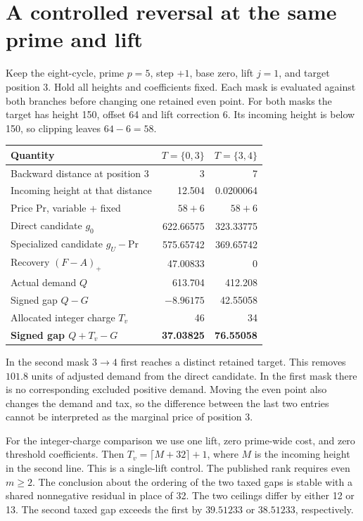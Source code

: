 \documentclass[12pt,letterpaper]{article}
\newcommand{\pagepart}[1]{\clearpage\section{#1}}
\begin{document}
\pagepart{A controlled reversal at the same prime and lift}
Keep the eight-cycle, prime \(p=5\), step \(+1\), base zero, lift \(j=1\), and target position 3. Hold all heights and coefficients fixed. Each mask is evaluated against both branches before changing one retained even point. For both masks the target has height 150, offset 64 and lift correction 6. Its incoming height is below 150, so clipping leaves \(64-6=58\).

\begin{center}\begin{tabular}{@{}lrr@{}}\toprule
Quantity & \(T=\{0,3\}\) & \(T=\{3,4\}\)\\\midrule
Backward distance at position 3 & 3 & 7\\
Incoming height at that distance & 12.504 & 0.0200064\\
Price \(\mathrm{Pr}\), variable + fixed & \(58+6\) & \(58+6\)\\
Direct candidate \(g_0\) & 622.66575 & 323.33775\\
Specialized candidate \(g_U-\mathrm{Pr}\) & 575.65742 & 369.65742\\
Recovery \((F-A)_+\) & 47.00833 & 0\\
Actual demand \(Q\) & 613.704 & 412.208\\
Signed gap \(Q-G\) & \(-8.96175\) & 42.55058\\
Allocated integer charge \(T_v\) & 46 & 34\\
\textbf{Signed gap \(Q+T_v-G\)} & \textbf{37.03825} & \textbf{76.55058}\\\bottomrule
\end{tabular}\end{center}
In the second mask \(3\to4\) first reaches a distinct retained target. This removes \(101.8\) units of adjusted demand from the direct candidate. In the first mask there is no corresponding excluded positive demand. Moving the even point also changes the demand and tax, so the difference between the last two entries cannot be interpreted as the marginal price of position 3.

For the integer-charge comparison we use one lift, zero prime-wide cost, and zero threshold coefficients. Then \(T_v=\lceil M+32\rceil+1\), where \(M\) is the incoming height in the second line. This is a single-lift control. The published rank requires even \(m\ge2\). The conclusion about the ordering of the two taxed gaps is stable with a shared nonnegative residual in place of 32. The two ceilings differ by either 12 or 13. The second taxed gap exceeds the first by \(39.51233\) or \(38.51233\), respectively.
\end{document}
